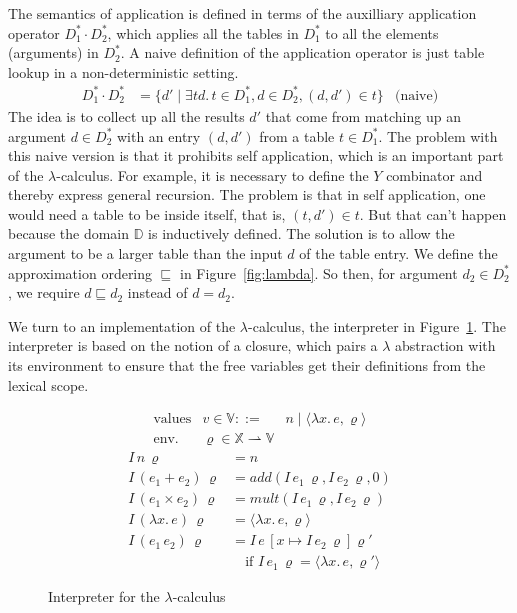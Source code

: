 \documentclass{tufte-handout}
\newcommand{\LAM}[1]{\lambda #1.\,}
\newcommand{\pto}[0]{\rightharpoonup}
\begin{document}
The semantics of application is defined in terms of the auxilliary
application operator $D^{*}_1 \cdot D^{*}_2$, which applies all the
tables in $D^{*}_1$ to all the elements (arguments) in $D^{*}_2$. A
naive definition of the application operator is just table lookup in a
non-deterministic setting.
\begin{align*}
  D^{*}_1 \cdot D^{*}_2 &= 
  \{ d' \mid
  \exists t d.\, t \in D^{*}_1, d \in D^{*}_2, 
    (d,d') \in t
  \}
  & \text{(naive)}
\end{align*}
The idea is to collect up all the results $d'$ that come from matching
up an argument $d \in D^{*}_2$ with an entry $(d,d')$ from a table $t \in
D^{*}_1$. The problem with this naive version is that it prohibits self
application, which is an important part of the $\lambda$-calculus.
For example, it is necessary to define the $Y$ combinator and thereby
express general recursion. The problem is that in self application,
one would need a table to be inside itself, that is, $(t,d') \in t$.
But that can't happen because the domain $\mathbb{D}$ is inductively
defined. The solution is to allow the argument to be a larger table
than the input $d$ of the table entry. We define the approximation
ordering $\sqsubseteq$ in Figure~\ref{fig:lambda}.  So then, for
argument $d_2 \in D^{*}_2$, we require $d \sqsubseteq d_2$ instead of $d =
d_2$.

We turn to an implementation of the $\lambda$-calculus, the
interpreter in Figure~\ref{fig:interp-lambda}. The interpreter is
based on the notion of a closure, which pairs a $\lambda$ abstraction
with its environment to ensure that the free variables get their
definitions from the lexical scope.

\begin{figure}
\[
\begin{array}{lrl}
 \text{values} & v \in \mathbb{V} ::= & n \mid \langle \LAM{x}e, \varrho \rangle \\
 \text{env.} & \varrho \in \mathbb{X} \pto \mathbb{V} 
\end{array}
\]
\begin{align*}
  I\,n\,\varrho &= n \\
  I\,(e_1 + e_2)\,\varrho &= \mathit{add}(I\,e_1\,\varrho, I\,e_2\,\varrho, 0) \\
  I\,(e_1 \times e_2)\,\varrho &= \mathit{mult}(I\,e_1\,\varrho, I\,e_2\,\varrho) \\
  I\,(\LAM{x}e)\,\varrho &= \langle \LAM{x}e, \varrho \rangle \\
  I\,(e_1\,e_2)\,\varrho &=  I\,e\,[x\mapsto I\,e_2\,\varrho]\varrho'\\
      & \quad \text{if } I\,e_1\,\varrho = \langle \LAM{x}e,\varrho' \rangle
\end{align*}

\caption{Interpreter for the $\lambda$-calculus}
\label{fig:interp-lambda}
\end{figure}
\end{document}
